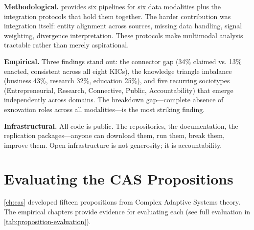 \documentclass[../main.tex]{subfiles}
\begin{document}
\textbf{Methodological.} \RoleBox{} provides six pipelines for six data modalities plus the integration protocols that hold them together. The harder contribution was integration itself: entity alignment across sources, missing data handling, signal weighting, divergence interpretation. These protocols make multimodal analysis tractable rather than merely aspirational.

\textbf{Empirical.} Three findings stand out: the connector gap (34\% claimed vs. 13\% enacted, consistent across all eight KICs), the knowledge triangle imbalance (business 43\%, research 32\%, education 25\%), and five recurring sociotypes (Entrepreneurial, Research, Connective, Public, Accountability) that emerge independently across domains. The breakdown gap---complete absence of exnovation roles across all modalities---is the most striking finding.

\textbf{Infrastructural.} All code is public. The repositories, the documentation, the replication packages---anyone can download them, run them, break them, improve them. Open infrastructure is not generosity; it is accountability.

\section{Evaluating the CAS Propositions}

\cref{ch:cas} developed fifteen propositions from Complex Adaptive Systems theory. The empirical chapters provide evidence for evaluating each (see full evaluation in \cref{tab:proposition-evaluation}).
\end{document}
